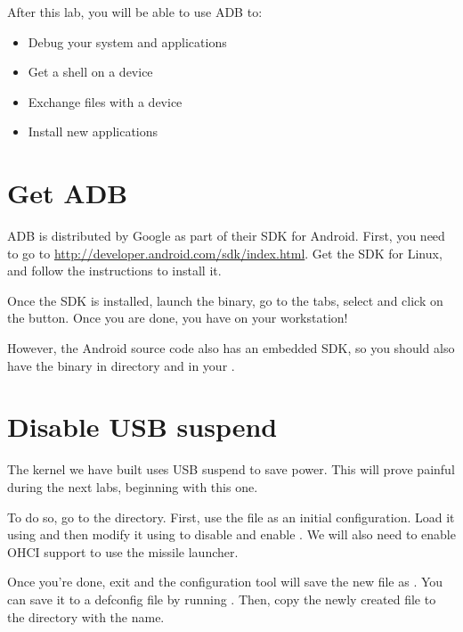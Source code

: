 
After this lab, you will be able to use ADB to:
\begin{itemize}
  \item Debug your system and applications
  \item Get a shell on a device
  \item Exchange files with a device
  \item Install new applications
\end{itemize}

\section{Get ADB}

ADB is distributed by Google as part of their SDK for Android. First,
you need to go to
\url{http://developer.android.com/sdk/index.html}. Get the SDK for
Linux, and follow the instructions to install it.

Once the SDK is installed, launch the  binary, go to the
 tabs, select  and
click on the  button. Once you are done, you have  on
your workstation!

However, the Android source code also has an embedded SDK, so you
should also have the  binary in 
directory and in your .

\section{Disable USB suspend}

The kernel we have built uses USB suspend to save power. This will
prove painful during the next labs, beginning with this one.

To do so, go to the  directory. First, use the
 file as an initial configuration. Load it using
 and then modify it using
 to disable 
and enable . We will also need to enable
OHCI support to use the missile launcher.

Once you're done, exit and the configuration tool will save the new
file as . You can save it to a defconfig file by
running . Then, copy the newly created
 file to the  directory with
the  name.

